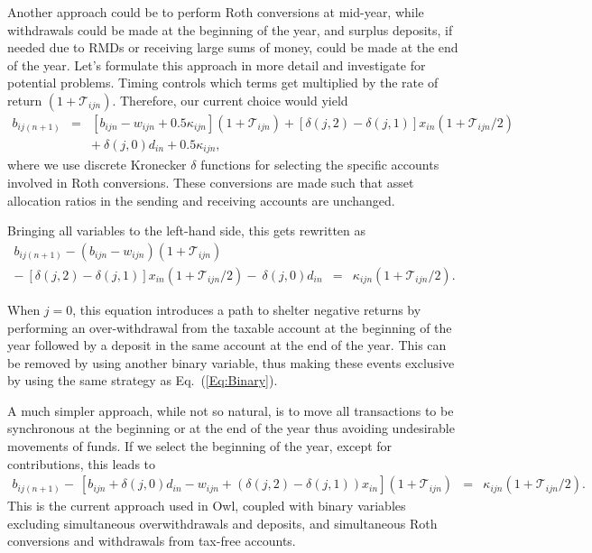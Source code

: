 \documentclass{report}[fleqn,12pt]
\begin{document}
	Another approach could be to perform Roth conversions at mid-year, while withdrawals
	could be made at the beginning of the year, and surplus deposits,
	if needed due to RMDs or receiving large sums of money,
	could be made at the end of the year. Let's formulate this approach
	in more detail and investigate for potential problems.
	Timing controls which terms get multiplied by the rate of return $(1 + \mathcal{T}_{ijn})$.
	Therefore, our current choice would yield
	\begin{eqnarray}
		\label{Eq:C3a}
		b_{ij(n+1)} &=& [b_{ijn} - w_{ijn} + 0.5\kappa_{ijn}](1 + \mathcal{T}_{ijn})
		+ [\delta(j, 2) - \delta(j, 1)]x_{in} (1 + \mathcal{T}_{ijn}/2)
		\nonumber \\
		&& 
		+\ \delta(j, 0) d_{in} + 0.5 \kappa_{ijn},
	\end{eqnarray}
	where we use discrete Kronecker $\delta$ functions for selecting the specific accounts involved
	in Roth conversions. These conversions are made such that asset allocation
	ratios in the sending and receiving accounts are unchanged.

	Bringing all variables
	to the left-hand side, this gets rewritten as
	\begin{eqnarray}
		\label{Eq:C3}
		b_{ij(n+1)} - (b_{ijn} - w_{ijn}) (1 + \mathcal{T}_{ijn})
		&& \nonumber \\
		-\ [\delta(j, 2) - \delta(j, 1)]x_{in}(1 + \mathcal{T}_{ijn}/2)
		-\ \delta(j, 0) d_{in}
		&=& \kappa_{ijn} (1 + \mathcal{T}_{ijn}/2).
	\end{eqnarray}

	When $j=0$, this equation introduces
	a path to shelter negative returns by performing an over-withdrawal from the taxable
	account at the beginning of the year followed by a deposit in the
	same account at the end of the year. This can 
	be removed by using another binary variable, thus making these events exclusive by using
	the same strategy as Eq.~(\ref{Eq:Binary}).

	A much simpler approach, while not so natural,
	is to move all transactions to be synchronous at the beginning or at the end of the year
	thus avoiding undesirable movements of funds.
	If we select the beginning of the year, except for contributions, this leads to
	\begin{eqnarray}
		\label{Eq:C3b}
		b_{ij(n+1)}
		- \ [b_{ijn} + \delta(j, 0)d_{in} - w_{ijn} + (\delta(j, 2) - \delta(j, 1))x_{in}]
		(1 + \mathcal{T}_{ijn})
		&=& \kappa_{ijn} (1 + \mathcal{T}_{ijn}/2).
		\nonumber
	\end{eqnarray}
This is the current approach used in Owl, coupled with
binary variables excluding simultaneous overwithdrawals and deposits, and
simultaneous Roth conversions and withdrawals from tax-free accounts.
\end{document}
